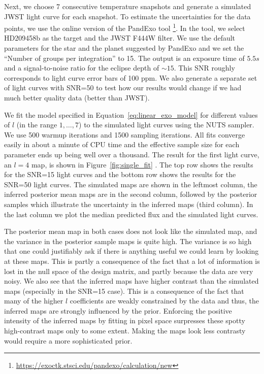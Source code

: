\documentclass[12pt,dvipsnames]{report}
\begin{document}
Next, we choose 7 consecutive temperature snapshots and generate a simulated JWST light curve 
for each snapshot. To estimate the uncertainties for the data points, we use the
online version of the PandExo tool
\citep{2017PASP..129f4501B}\footnote{\url{https://exoctk.stsci.edu/pandexo/calculation/new}}. 
In the tool, we select HD209458b as the target and the JWST F444W filter. We use the default 
parameters for the star and the planet suggested by PandExo and we set the ``Number of 
groups per integration'' to 15. The output is an exposure time of $5.5s$ and a 
signal-to-noise ratio for the eclipse depth of $\sim 15$.  This SNR roughly corresponds to 
light curve error bars of 100 ppm.  We also generate a separate set of light curves with 
SNR=50 to test how our results would change if we had much better quality data 
(better than JWST).


We fit the model specified in Equation~\ref{eq:linear_exo_model} for different values of 
$l$ (in the range $1,\ldots,7$) to the simulated light curves using the NUTS sampler.
We use 500 warmup iterations and 1500 sampling iterations. All fits converge easily in 
about a minute of CPU time and the effective sample size for each parameter ends up being 
well over a thousand. The result for the first light curve, an $l=4$ map, is shown in 
Figure~\ref{fig:single_fit} .
The top row shows the results for the SNR=15 light curves and the bottom row shows the
results for the SNR=50 light curves. The simulated maps are shown in the leftmost 
column, the inferred posterior mean maps are in the second column, followed by 
the posterior samples which illustrate the uncertainty in the inferred maps (third column).
In the last column we plot the median predicted flux and the simulated light curves.

The posterior mean map in both cases does not look like the simulated map, and 
the variance in the posterior sample maps is quite high. 
The variance is so high that one could justifiably ask if there is anything useful we 
could learn by looking at these maps. 
This is partly a consequence 
of the fact that a lot of information is lost in the null space of the design matrix,
and partly because the data are very noisy. 
We also see that the inferred maps have higher contrast than the simulated maps 
(especially in the SNR=15 case). 
This is a consequence of the fact that many of the higher $l$
coefficients are weakly constrained by the data and thus, the inferred maps are 
strongly influenced by the prior. 
Enforcing the positive intensity of the inferred maps by fitting in pixel space 
surpresses these spotty high-contrast maps only to some extent.
Making the maps look less contrasty would require a more sophisticated prior.
\end{document}
